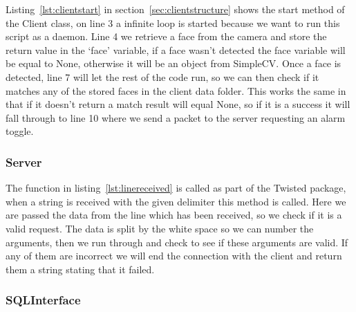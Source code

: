 \documentclass[12pt,a4paper]{report}
\begin{document}
        \begin{figure}[H]
        
        \end{figure}

        Listing~\ref{lst:clientstart} in section~\ref{sec:clientstructure} shows the start method of the Client class, on line 3 a infinite loop is started because we want to run this script
        as a daemon. Line 4 we retrieve a face from the camera and store the return value in the `face' variable, if a face wasn't detected the face variable
        will be equal to None, otherwise it will be an object from SimpleCV. Once a face is detected, line 7 will let the rest of the code run, so we can then
        check if it matches any of the stored faces in the client data folder. This works the same in that if it doesn't return a match result will equal None,
        so if it is a success it will fall through to line 10 where we send a packet to the server requesting an alarm toggle.

        \subsubsection{Server}

        

        The function in listing~\ref{lst:linereceived} is called as part of the Twisted package, when a string is received with the given delimiter this method is called. Here we are passed the
        data from the line which has been received, so we check if it is a valid request. The data is split by the white space so we can number the arguments, then
        we run through and check to see if these arguments are valid. If any of them are incorrect we will end the connection with the client and return them a string
        stating that it failed.

        \subsubsection{SQLInterface}
\end{document}
